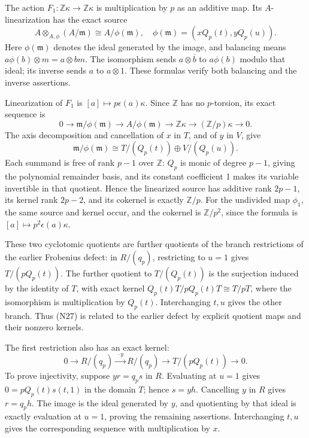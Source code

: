 \documentclass[
]{article}
\begin{document}
The action \(F_1:\mathbb Z\kappa\to\mathbb Z\kappa\) is multiplication
by \(p\) as an additive map. Its \(A\)-linearization has the exact
source \[
A\otimes_{A,\phi}(A/\mathfrak m)
\cong A/\phi(\mathfrak m),
\quad\phi(\mathfrak m)=(xQ_p(t),yQ_p(u)).
\tag{N25}
\] Here \(\phi(\mathfrak m)\) denotes the ideal generated by the image,
and balancing means \(a\phi(b)\otimes m=a\otimes bm\). The isomorphism
sends \(a\otimes\overline b\) to \(a\phi(b)\) modulo that ideal; its
inverse sends \(a\) to \(a\otimes1\). These formulas verify both
balancing and the inverse assertions.

Linearization of \(F_1\) is \([a]\mapsto p\epsilon(a)\kappa\). Since
\(\mathbb Z\) has no \(p\)-torsion, its exact sequence is \[
0\longrightarrow\mathfrak m/\phi(\mathfrak m)
\longrightarrow A/\phi(\mathfrak m)
\longrightarrow\mathbb Z\kappa
\longrightarrow(\mathbb Z/p)\kappa\longrightarrow0.
\tag{N26}
\] The axis decomposition and cancellation of \(x\) in \(T\), and of
\(y\) in \(V\), give \[
\mathfrak m/\phi(\mathfrak m)
\cong T/(Q_p(t))\oplus V/(Q_p(u)).
\tag{N27}
\] Each summand is free of rank \(p-1\) over \(\mathbb Z\): \(Q_p\) is
monic of degree \(p-1\), giving the polynomial remainder basis, and its
constant coefficient 1 makes its variable invertible in that quotient.
Hence the linearized source has additive rank \(2p-1\), its kernel rank
\(2p-2\), and its cokernel is exactly \(\mathbb Z/p\). For the undivided
map \(\phi_1\), the same source and kernel occur, and the cokernel is
\(\mathbb Z/p^2\), since the formula is
\([a]\mapsto p^2\epsilon(a)\kappa\).

These two cyclotomic quotients are further quotients of the branch
restrictions of the earlier Frobenius defect: in \(R/(q_p)\),
restricting to \(u=1\) gives \(T/(pQ_p(t))\). The further quotient to
\(T/(Q_p(t))\) is the surjection induced by the identity of \(T\), with
exact kernel \(Q_p(t)T/pQ_p(t)T\cong T/pT\), where the isomorphism is
multiplication by \(Q_p(t)\). Interchanging \(t,u\) gives the other
branch. Thus (N27) is related to the earlier defect by explicit quotient
maps and their nonzero kernels.

The first restriction also has an exact kernel: \[
0\longrightarrow R/(q_p)\xrightarrow{\ \cdot y\ }R/(q_p)
\longrightarrow T/(pQ_p(t))\longrightarrow0.
\tag{N27a}
\] To prove injectivity, suppose \(yr=q_ps\) in \(R\). Evaluating at
\(u=1\) gives \(0=pQ_p(t)s(t,1)\) in the domain \(T\); hence \(s=yh\).
Cancelling \(y\) in \(R\) gives \(r=q_ph\). The image is the ideal
generated by \(y\), and quotienting by that ideal is exactly evaluation
at \(u=1\), proving the remaining assertions. Interchanging \(t,u\)
gives the corresponding sequence with multiplication by \(x\).
\end{document}
